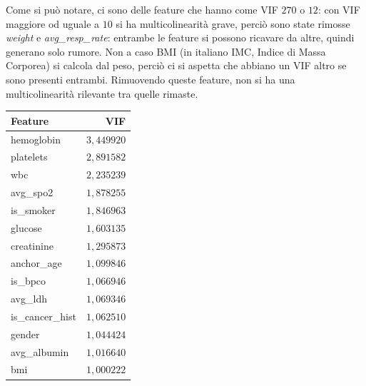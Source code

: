 \documentclass[10pt,a4paper]{article}
\begin{document}
        \noindent Come si può notare, ci sono delle feature che hanno come VIF $270$ o $12$: con VIF maggiore od uguale 
        a $10$ si ha multicolinearità grave, perciò sono state rimosse \textit{weight} e \textit{avg_resp_rate}: 
        entrambe le feature si possono ricavare da altre, quindi generano solo rumore. Non a caso BMI (in italiano IMC, Indice di Massa Corporea)
         si calcola dal peso, perciò ci si aspetta che abbiano un VIF altro se sono presenti entrambi. Rimuovendo queste 
        feature, non si ha una multicolinearità rilevante tra quelle rimaste.
        \begin{table}[H]
            \centering
                \small
                \begin{tabular}{|l|r|}
                    \hline
                    \textbf{Feature} & \textbf{VIF} \\
                    \hline
                    hemoglobin & $3{,}449920$ \\
                    \hline
                    platelets & $2{,}891582$ \\
                    \hline
                    wbc & $2{,}235239$ \\
                    \hline
                    avg\_spo2 & $1{,}878255$ \\
                    \hline
                    is\_smoker & $1{,}846963$ \\
                    \hline
                    glucose & $1{,}603135$ \\
                    \hline
                    creatinine & $1{,}295873$ \\
                    \hline
                    anchor\_age & $1{,}099846$ \\
                    \hline
                    is\_bpco & $1{,}066946$ \\
                    \hline
                    avg\_ldh & $1{,}069346$ \\
                    \hline
                    is\_cancer\_hist & $1{,}062510$ \\
                    \hline
                    gender & $1{,}044424$ \\
                    \hline
                    avg\_albumin & $1{,}016640$ \\
                    \hline
                    bmi & $1{,}000222$ \\
                    \hline
                \end{tabular}
        \end{table}
\end{document}
